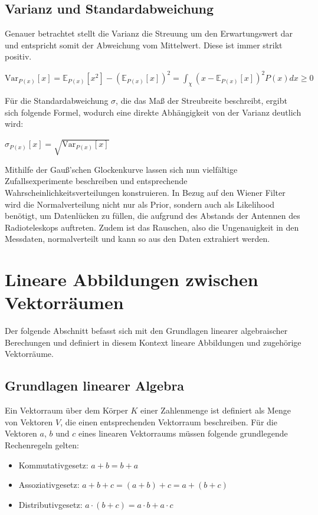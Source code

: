 \documentclass[]{dsadokumentation}
\begin{document}
\subsection{Varianz und Standardabweichung}
Genauer betrachtet stellt die Varianz die Streuung um den Erwartungswert dar und entspricht somit der Abweichung vom Mittelwert. Diese ist immer strikt positiv.
\begin{center} $\mathrm{Var} _{P(x)} [x] = \mathbb{E} _{P(x)} [x^{2}] - (\mathbb{E} _{P(x)} [x])^{2} = \int_ {\chi} (x - \mathbb{E} _{P(x)} [x])^{2} P(x) dx \geq 0$ \end{center}
Für die Standardabweichung $\sigma$, die das Maß der Streubreite beschreibt, ergibt sich folgende Formel, wodurch eine direkte Abhängigkeit von der Varianz deutlich wird:
\begin{center} $\sigma _{P(x)} [x] = \sqrt{\mathrm{Var} _{P(x)} [x]}$ \end{center}

Mithilfe der Gauß'schen Glockenkurve lassen sich nun vielfältige Zufallsexperimente beschreiben und entsprechende Wahrscheinlichkeitsverteilungen konstruieren. In Bezug auf den Wiener Filter wird die Normalverteilung nicht nur als Prior, sondern auch als Likelihood benötigt, um Datenlücken zu füllen, die aufgrund des Abstands der Antennen des Radioteleskops auftreten. Zudem ist das Rauschen, also die Ungenauigkeit in den Messdaten, normalverteilt und kann so aus den Daten extrahiert werden.

\section{Lineare Abbildungen zwischen Vektorräumen}\label{k4.2.ch.linalg}
Der folgende Abschnitt befasst sich mit den Grundlagen linearer algebraischer Berechungen und definiert in diesem Kontext lineare Abbildungen und zugehörige Vektorräume.

\subsection{Grundlagen linearer Algebra}
Ein Vektorraum über dem Körper $K$ einer Zahlenmenge ist definiert als Menge von Vektoren $V$, die einen entsprechenden Vektorraum beschreiben. Für die Vektoren $a$, $b$ und $c$ eines linearen Vektorraums müssen folgende grundlegende Rechenregeln gelten:
\begin{itemize}
\item Kommutativgesetz: $a + b = b + a$
\item Assoziativgesetz: $a + b + c = (a + b) + c = a + (b + c)$
\item Distributivgesetz: $a \cdot (b + c) = a \cdot b + a \cdot c$
\end{itemize}
\end{document}
